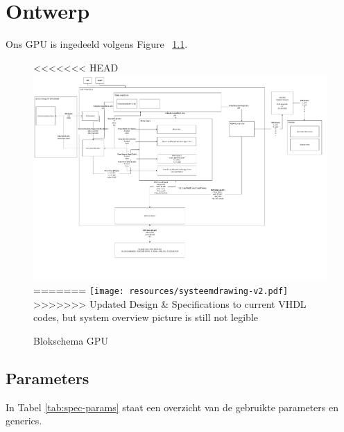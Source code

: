 \documentclass{scrreprt} %
\date{22 november 2013}
\begin{document}
\chapter{Ontwerp}
Ons GPU is ingedeeld volgens Figure ~\ref{fig:Blokschema GPU}.
\begin{figure}[H]
\centering
<<<<<<< HEAD
	\includegraphics[width=\linewidth]{resource/systeemdrawing-rc.pdf}
=======
	\texttt{[image: resources/systeemdrawing-v2.pdf]}
>>>>>>> Updated Design & Specifications to current VHDL codes, but system overview picture is still not legible
	\caption{Blokschema GPU}
	\label{fig:Blokschema GPU}
\end{figure}

\section{Parameters}
In Tabel \ref{tab:spec-params} staat een overzicht van de gebruikte parameters en generics.
\end{document}
